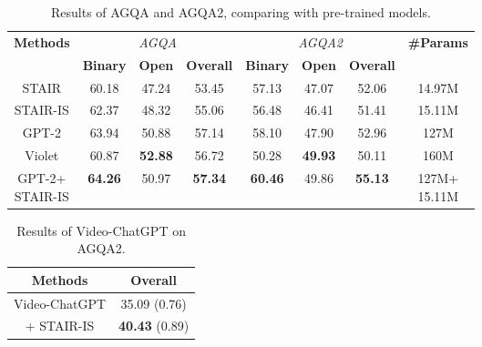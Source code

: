 \documentclass[letterpaper]{article} %
\begin{document}
\begin{table}[t]
    \setlength{\abovecaptionskip}{5pt}
    \centering
    \begin{tabular}{c|ccc|ccc|c}
        \hline
        \multirow{2}{*}{\textbf{Methods}} & \multicolumn{3}{c|}{\textit{AGQA}} & \multicolumn{3}{c|}{\textit{AGQA2}} & \multirow{2}{*}{\textbf{\#Params}} \\
        & \textbf{Binary} & \textbf{Open} & \textbf{Overall} & \textbf{Binary} & \textbf{Open} & \textbf{Overall} & \\
        \hline
        STAIR & 60.18 & 47.24 & 53.45 & 57.13 & 47.07 & 52.06 & 14.97M \\
        STAIR-IS & 62.37 & 48.32 & 55.06 & 56.48 & 46.41 & 51.41 & 15.11M \\
        GPT-2 & 63.94 & 50.88 & 57.14 & 58.10 & 47.90 & 52.96 & 127M \\
        Violet & 60.87 & \textbf{52.88} & 56.72 & 50.28 & \textbf{49.93} & 50.11 & 160M \\
        \makecell[c]{GPT-2+ \\ STAIR-IS} & \textbf{64.26} & 50.97 & \textbf{57.34} & \textbf{60.46} & 49.86 & \textbf{55.13} & \makecell[c]{127M+ \\ 15.11M} \\
        \hline
    \end{tabular}
    \caption{Results of AGQA and AGQA2, comparing with pre-trained models.}
    \label{tab:pretrain}
\end{table}

\begin{table}[t]
    \centering
    \begin{tabular}{c|c}
        \hline
        \textbf{Methods} & \textbf{Overall} \\
        \hline
        Video-ChatGPT & 35.09 (0.76) \\
        + STAIR-IS & \textbf{40.43} (0.89) \\
        \hline
    \end{tabular}
    \caption{Results of Video-ChatGPT on AGQA2.}
    \label{tab:zs_agqa2}
\end{table}
\end{document}
